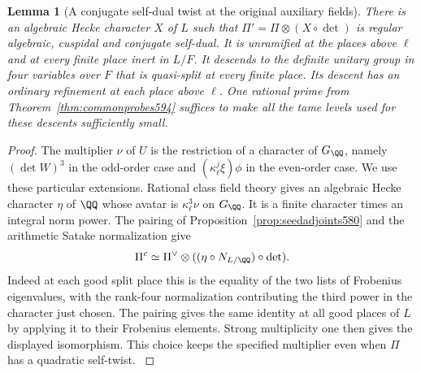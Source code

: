 \documentclass[a4paper,11pt]{article}
\newtheorem{lemma}[proposition]{Lemma}
\theoremstyle{definition}
\theoremstyle{remark}
\numberwithin{equation}{section}
\begin{document}
\begin{lemma}[A conjugate self-dual twist at the original auxiliary fields]
\leavevmode\label{lem:unitaryseed595}
There is an algebraic Hecke character \(X\) of \(L\) such that
\(\Pi'=\Pi\otimes(X\circ\det)\) is regular algebraic,
cuspidal and conjugate self-dual. It is unramified at the
places above \(\ell\) and at every finite place inert in
\(L/F\). It descends to the definite unitary group in four
variables over \(F\) that is quasi-split at every finite
place. Its descent has an ordinary refinement at each
place above \(\ell\). One rational prime from
Theorem~\ref{thm:commonprobes594} suffices to make all the
tame levels used for these descents sufficiently small.
\end{lemma}
\begin{proof}
The multiplier \(\nu\) of \(U\) is the restriction of a
character of \(G_\QQ\), namely \((\det W)^3\) in the odd-order
case and \((\kappa_\ell^j\xi)\phi\) in the even-order case.
We use these particular extensions. Rational class field
theory gives an algebraic Hecke character \(\eta\) of
\(\QQ\) whose avatar is \(\kappa_\ell^3\nu\) on \(G_\QQ\).
It is a finite character times an integral norm power.
The pairing of Proposition~\ref{prop:seedadjoints580} and
the arithmetic Satake normalization give
\[
       \Pi^c\simeq\Pi^\vee\otimes
                  ((\eta\circ N_{L/\QQ})\circ\det).
\]
Indeed at each good split place this is the equality of
the two lists of Frobenius eigenvalues, with the
rank-four normalization contributing the third power
in the character just chosen. The pairing gives the
same identity at all good places of \(L\) by applying
it to their Frobenius elements. Strong multiplicity one
then gives the displayed isomorphism. This choice keeps
the specified multiplier even when \(\Pi\) has a
quadratic self-twist. \cite{XII-IX-blggt560}


\end{proof}
\end{document}
